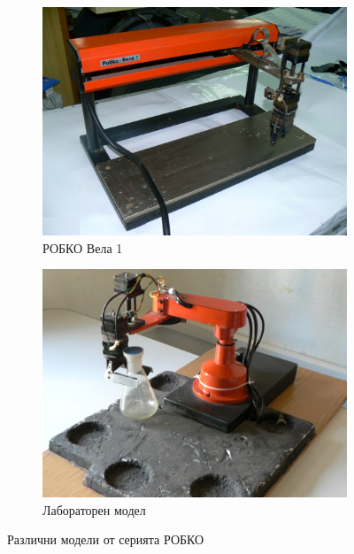 \begin{figure}
    \begin{subfigure}{0.45\textwidth}
        \centering
        \includegraphics[width=\linewidth]{pictures/robko_vela.jpg}
        \caption{РОБКО Вела 1}
        \label{fig:robko_vela}
    \end{subfigure}
    \hfill%
    \begin{subfigure}{0.45\textwidth}
        \centering
        \includegraphics[width=\linewidth]{pictures/robko_lab.jpg}
        \caption{Лабораторен модел}
        \label{fig:robko_lab}
    \end{subfigure}
    \caption{Различни модели от серията РОБКО}
    \label{fig:robko_series}
\end{figure}
